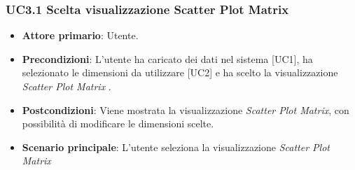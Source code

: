 \subsubsection{UC3.1 Scelta visualizzazione Scatter Plot Matrix}
\begin{itemize}
	\item \textbf{Attore primario}: Utente.
	\item \textbf{Precondizioni}: L'utente ha caricato dei dati nel sistema [UC1], ha selezionato le dimensioni da utilizzare [UC2] e ha scelto la visualizzazione \textit{Scatter Plot Matrix} .
	\item \textbf{Postcondizioni}: Viene mostrata la visualizzazione \textit{Scatter Plot Matrix}, con possibilità di modificare le dimensioni scelte.
	\item \textbf{Scenario principale}: L'utente seleziona la visualizzazione \textit{Scatter Plot Matrix}
\end{itemize}